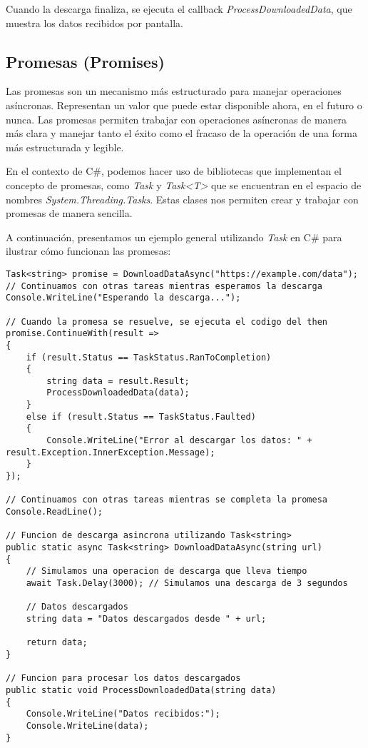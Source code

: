 \documentclass[executivepaper]{article}
\begin{document}
Cuando la descarga finaliza, se ejecuta el callback \emph{ProcessDownloadedData}, que muestra los datos recibidos por pantalla.

\subsection{Promesas (Promises)}

Las promesas son un mecanismo más estructurado para manejar operaciones asíncronas. Representan un valor que puede estar disponible ahora, en el futuro o nunca. Las promesas permiten trabajar con operaciones asíncronas de manera más clara y manejar tanto el éxito como el fracaso de la operación de una forma más estructurada y legible.

En el contexto de C\#, podemos hacer uso de bibliotecas que implementan el concepto de promesas, como \emph{Task} y \emph{Task<T>} que se encuentran en el espacio de nombres \emph{System.Threading.Tasks}. Estas clases nos permiten crear y trabajar con promesas de manera sencilla.

A continuación, presentamos un ejemplo general utilizando \emph{Task} en C\# para ilustrar cómo funcionan las promesas:

\begin{lstlisting}
Task<string> promise = DownloadDataAsync("https://example.com/data");
// Continuamos con otras tareas mientras esperamos la descarga
Console.WriteLine("Esperando la descarga...");

// Cuando la promesa se resuelve, se ejecuta el codigo del then
promise.ContinueWith(result =>
{
    if (result.Status == TaskStatus.RanToCompletion)
    {
        string data = result.Result;
        ProcessDownloadedData(data);
    }
    else if (result.Status == TaskStatus.Faulted)
    {
        Console.WriteLine("Error al descargar los datos: " + result.Exception.InnerException.Message);
    }
});

// Continuamos con otras tareas mientras se completa la promesa
Console.ReadLine();

// Funcion de descarga asincrona utilizando Task<string>
public static async Task<string> DownloadDataAsync(string url)
{
    // Simulamos una operacion de descarga que lleva tiempo
    await Task.Delay(3000); // Simulamos una descarga de 3 segundos

    // Datos descargados
    string data = "Datos descargados desde " + url;

    return data;
}

// Funcion para procesar los datos descargados
public static void ProcessDownloadedData(string data)
{
    Console.WriteLine("Datos recibidos:");
    Console.WriteLine(data);
}
\end{lstlisting}
\end{document}
